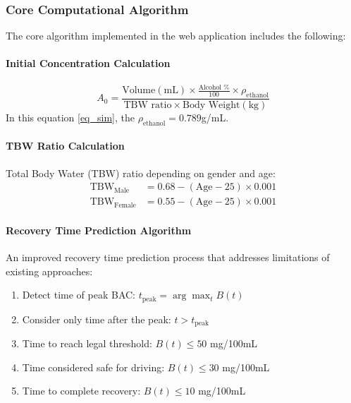 \documentclass[11pt]{article}
\begin{document}
\subsubsection{Core Computational Algorithm}

The core algorithm implemented in the web application includes the following:

\paragraph{Initial Concentration Calculation}
\begin{equation}\label{eq_sim}
A_0 = \frac{\text{Volume}(\text{mL}) \times \frac{\text{Alcohol \%}}{100} \times \rho_{\text{ethanol}}}{\text{TBW ratio} \times \text{Body Weight}(\text{kg})}
\end{equation}
In this equation \ref{eq_sim}, the $\rho_{\text{ethanol}}=0.789$g/mL. 

\paragraph{TBW Ratio Calculation}
Total Body Water (TBW) ratio depending on gender and age:
\begin{align}
\text{TBW}_{\text{Male}} &= 0.68 - (\text{Age} - 25) \times 0.001 \\
\text{TBW}_{\text{Female}} &= 0.55 - (\text{Age} - 25) \times 0.001
\end{align}

\paragraph{Recovery Time Prediction Algorithm}
An improved recovery time prediction process that addresses limitations of existing approaches:
\begin{enumerate}
    \item Detect time of peak BAC: $t_{\text{peak}} = \arg\max_t B(t)$
    \item Consider only time after the peak: $t > t_{\text{peak}}$
    \item Time to reach legal threshold: $B(t) \leq 50$ mg/100mL
    \item Time considered safe for driving: $B(t) \leq 30$ mg/100mL  
    \item Time to complete recovery: $B(t) \leq 10$ mg/100mL
\end{enumerate}
\end{document}
